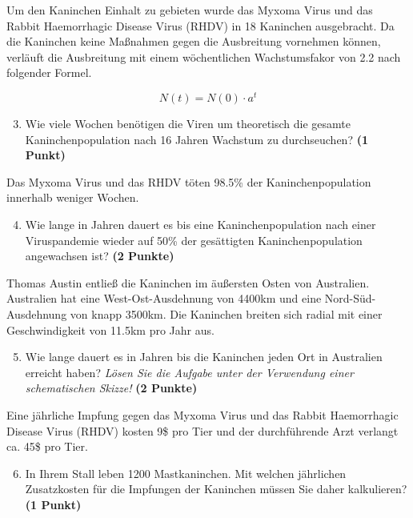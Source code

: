 \documentclass[a4paper, 9pt]{scrartcl}\usepackage[]{graphicx}\usepackage[]{xcolor}
\begin{document}
Um den Kaninchen Einhalt zu gebieten wurde das Myxoma Virus und das Rabbit
Haemorrhagic Disease Virus (RHDV) in 18 Kaninchen
ausgebracht. Da die Kaninchen keine Ma{\ss}nahmen gegen die Ausbreitung
vornehmen k{\"o}nnen, verl{\"a}uft die Ausbreitung mit einem w{\"o}chentlichen
Wachstumsfakor von 2.2 nach folgender Formel.

\begin{equation*}
  N(t) = N(0) \cdot a^t
\end{equation*}

\begin{enumerate}
  \setcounter{enumi}{2}
\item Wie viele Wochen ben{\"o}tigen die Viren um theoretisch die gesamte
  Kaninchenpopulation nach 16 Jahren Wachstum zu
  durchseuchen? \textbf{(1 Punkt)}
\end{enumerate}

Das Myxoma Virus und das RHDV t{\"o}ten 98.5\% der
Kaninchenpopulation innerhalb weniger Wochen.

\begin{enumerate}
  \setcounter{enumi}{3}  
\item Wie lange in Jahren dauert es bis eine Kaninchenpopulation nach einer
  Viruspandemie wieder auf 50\% der ges{\"a}ttigten
  Kaninchenpopulation angewachsen ist?  \textbf{(2 Punkte)}
\end{enumerate}

Thomas Austin entlie{\ss} die Kaninchen im {\"a}u{\ss}ersten Osten von
Australien. Australien hat eine West-Ost-Ausdehnung von 4400km
und eine Nord-S{\"u}d-Ausdehnung von knapp 3500km. Die Kaninchen
breiten sich radial mit einer Geschwindigkeit von 11.5km pro
Jahr aus.

\begin{enumerate}
  \setcounter{enumi}{4}
\item Wie lange dauert es in Jahren bis die Kaninchen jeden Ort
  in Australien erreicht haben? \textit{L{\"o}sen Sie die Aufgabe unter der
    Verwendung einer schematischen Skizze!} \textbf{(2 Punkte)}
\end{enumerate}

Eine j{\"a}hrliche Impfung gegen das Myxoma Virus und das Rabbit Haemorrhagic
Disease Virus (RHDV) kosten 9\$ pro Tier und der
durchf{\"u}hrende Arzt verlangt ca. 45\$ pro Tier.

\begin{enumerate}
  \setcounter{enumi}{5}
\item In Ihrem Stall leben 1200 Mastkaninchen. Mit welchen
  j{\"a}hrlichen Zusatzkosten f{\"u}r die Impfungen der Kaninchen m{\"u}ssen Sie daher
  kalkulieren? \textbf{(1 Punkt)}
\end{enumerate}
 
\end{document}

